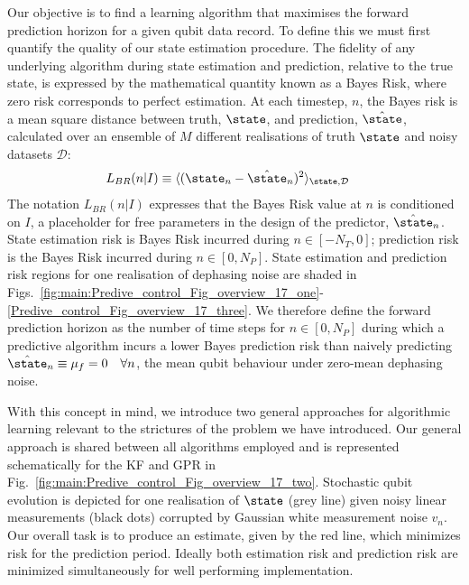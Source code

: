 Our objective is to find a learning algorithm that maximises the forward prediction horizon for a given qubit data record.  To define this we must first quantify the quality of our state estimation procedure.  The fidelity of any underlying algorithm during state estimation and prediction, relative to the true state, is expressed by the mathematical quantity known as a Bayes Risk, where zero risk corresponds to perfect estimation. At each timestep, $n$, the Bayes risk is a mean square distance between truth, $\state$, and prediction, $\hat{\state}$, calculated over an ensemble of $M$ different realisations of truth $\state$ and noisy datasets $\mathcal{D}$:
\begin{align}
L_{BR}(n | I) & \equiv \langle(\state_n - \hat{\state}_n)^2 \rangle_{\state,\mathcal{D}} \label{eqn:main:sec:ap_opt_LossBR}
\end{align}
The notation $L_{BR}(n | I)$ expresses that the Bayes Risk value at $n$ is conditioned on $I$, a placeholder for free parameters in the design of the predictor, $\hat{\state}_n$. State estimation risk is Bayes Risk incurred during $n \in [-N_T, 0]$; prediction risk is the Bayes Risk incurred during $n \in [0, N_P]$. State estimation and prediction risk regions for one realisation of dephasing noise are shaded in Figs.~\ref{fig:main:Predive_control_Fig_overview_17_one}-\ref{Predive_control_Fig_overview_17_three}.  We therefore define the forward prediction horizon as the number of time steps for $ n \in [0, N_P]$ during which a predictive algorithm incurs a lower Bayes prediction risk than naively predicting $\hat{\state}_n \equiv \mu_f = 0 \quad \forall n$, the mean qubit behaviour under zero-mean dephasing noise. 

With this concept in mind, we introduce two general approaches for algorithmic learning relevant to the strictures of the problem we have introduced.  Our general approach is shared between all algorithms employed and is represented schematically for the KF and GPR in Fig.~\ref{fig:main:Predive_control_Fig_overview_17_two}. Stochastic qubit evolution is depicted for one realisation of $\state$ (grey line) given noisy linear measurements (black dots) corrupted by Gaussian white measurement noise $v_n$.  Our overall task is to produce an estimate, given by the red line, which minimizes risk for the prediction period.  Ideally both estimation risk and prediction risk are minimized simultaneously for well performing implementation.

